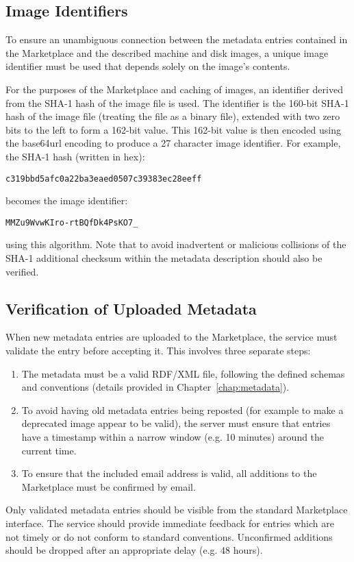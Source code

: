 \subsection{Image Identifiers}

To ensure an unambiguous connection between the metadata entries
contained in the Marketplace and the described machine and disk
images, a unique image identifier must be used that depends solely on
the image's contents.

For the purposes of the Marketplace and caching of images, an
identifier derived from the SHA-1 hash of the image file is used.  The
identifier is the 160-bit SHA-1 hash of the image file (treating the
file as a binary file), extended with two zero bits to the left to
form a 162-bit value.  This 162-bit value is then encoded using the
base64url encoding to produce a 27 character image identifier.  For
example, the SHA-1 hash (written in hex):
\begin{verbatim}
c319bbd5afc0a22ba3eaed0507c39383ec28eeff
\end{verbatim}
becomes the image identifier:
\begin{verbatim}
MMZu9WvwKIro-rtBQfDk4PsKO7_
\end{verbatim}
using this algorithm.  Note that to avoid inadvertent or malicious
collisions of the SHA-1 additional checksum within the metadata
description should also be verified.

\subsection{Verification of Uploaded Metadata}

When new metadata entries are uploaded to the Marketplace, the service
must validate the entry before accepting it.  This involves three
separate steps:
\begin{enumerate}
\item The metadata must be a valid RDF/XML file, following the defined
  schemas and conventions (details provided in
  Chapter~\ref{chap:metadata}).
\item To avoid having old metadata entries being reposted (for example
  to make a deprecated image appear to be valid), the server must
  ensure that entries have a timestamp within a narrow window (e.g. 10
  minutes) around the current time.
\item To ensure that the included email address is valid, all
  additions to the Marketplace must be confirmed by email.
\end{enumerate}
Only validated metadata entries should be visible from the standard
Marketplace interface.  The service should provide immediate feedback
for entries which are not timely or do not conform to standard
conventions.  Unconfirmed additions should be dropped after an
appropriate delay (e.g. 48 hours).


